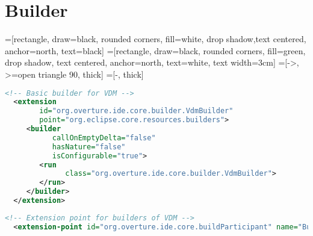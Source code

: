 \section{Builder}

=[rectangle, draw=black, rounded corners, fill=white, drop shadow,text centered, anchor=north, text=black]
=[rectangle, draw=black, rounded corners, fill=green, drop shadow,
        text centered, anchor=north, text=white, text width=3cm]
=[->, >=open triangle 90, thick]
=[-, thick]
        
\begin{center}
\end{center}


\begin{lstlisting}[language=XML]
<!-- Basic builder for VDM -->
  <extension
        id="org.overture.ide.core.builder.VdmBuilder"
        point="org.eclipse.core.resources.builders">
     <builder
           callOnEmptyDelta="false"
           hasNature="false"
           isConfigurable="true">
        <run
              class="org.overture.ide.core.builder.VdmBuilder">
        </run>
     </builder>
  </extension>
\end{lstlisting}


\begin{lstlisting}[language=XML]
 <!-- Extension point for builders of VDM -->
  <extension-point id="org.overture.ide.core.buildParticipant" name="Builder" schema="schema/org.overture.ide.core.builder.exsd"/>
\end{lstlisting}


